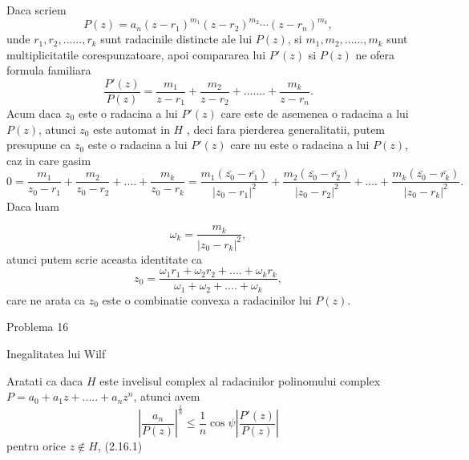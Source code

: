 \documentclass[a4paper,12pt,oneside]{report}
\begin{document}
Daca scriem 
\begin{displaymath}
  P\left ( z \right ) = a_{n}\left ( z - r_{1} \right )^{m_{1}}\left ( z - r_{2} \right )^{m_{2}}\cdots \left ( z - r_{n} \right )^{m_{k}},
\end{displaymath}
unde  \(r_{1} , r_{2}, ......, r_{k}\) sunt radacinile distincte ale lui \(P\left ( z \right )\), si \(m_{1} , m_{2}, ......, m_{k}\) sunt multiplicitatile corespunzatoare, apoi compararea lui \({P}'\left ( z \right )\) si \( P\left ( z \right )\) ne ofera formula familiara
\begin{displaymath}
  \frac{{P}'\left ( z \right ) }{P\left ( z \right )} = \frac{m_{1}}{z - r_{1}} + \frac{m_{2}}{z - r_{2}}+ .......+ \frac{m_{k}}{z - r_{n}} . 
\end{displaymath}
Acum daca \(z_{0}\) este o radacina a lui \({P}'\left ( z \right )\) care este de asemenea o radacina a lui \(P\left ( z \right )\), atunci \(z_{0}\) este automat in \(H\) , deci fara pierderea generalitatii, putem presupune ca \(z_{0}\)  este o radacina a lui  \({P}'\left ( z \right )\) care nu este o radacina a lui \(P\left ( z \right )\), caz in care gasim 
\begin{displaymath}
  0 = \frac{m_{1}}{z_{0} - r_{1}} + \frac{m_{2}}{z_{0} - r_{2}} +....+ \frac{m_{k}}{z_{0} - r_{k}} = \frac{m_{1}\left (\bar{z_{0}} - \bar{r_{1}}\right )}{\left | z_{0}  - r_{1}\right |^{2}} + \frac{m_{2}\left (\bar{z_{0}} - \bar{r_{2}}\right )}{\left | z_{0}  - r_{2}\right |^{2}} + ....+ \frac{m_{k}\left (\bar{z_{0}} - \bar{r_{k}}\right )}{\left | z_{0}  - r_{k}\right |^{2}}. 
\end{displaymath}
Daca luam 

\begin{displaymath}
  \omega _{k} =\frac{ m_{k}}{\left | z_{0}  - r_{k}\right |^{2}},
\end{displaymath} atunci putem scrie aceasta identitate ca 
\begin{displaymath}
  z_{0} = \frac{\omega _{1}r_{1} +\omega _{2}r{_2}+....+ \omega _{k}r{_k} }{\omega _{1} + \omega _{2} + .... + \omega _{k}}, 
\end{displaymath}
care ne arata ca \(z_{0}\) este o combinatie convexa a radacinilor lui \(P\left ( z \right )\). 


Problema 16 

Inegalitatea lui Wilf 

Aratati ca daca \(H\) este invelisul complex al radacinilor polinomului complex \(P = a_{0} + a_{1}z + ..... +a_{n}z^{n}\), atunci avem 
\begin{displaymath}
  \left | \frac{a_{n}}{P\left ( z \right )} \right |^{\frac{1}{n}}\leq \frac{1}n\cos{\psi }\left | \frac{{P}'\left ( z \right )}{P\left ( z \right )} \right |
\end{displaymath}
 pentru orice \(z\notin H\), (2.16.1)
\end{document}
